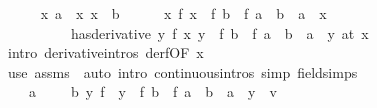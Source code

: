 \begin{isabellebody}
\ \ \ \ \isamarkupfalse%
\ x{\isacharcolon}{\kern0pt}\ {\isachardoublequoteopen}a\ {\isacharless}{\kern0pt}\ x{\isachardoublequoteclose}\ {\isachardoublequoteopen}x\ {\isacharless}{\kern0pt}\ b{\isachardoublequoteclose}\isanewline
\ \ \ \ \isamarkupfalse%
\ {\isachardoublequoteopen}{\isacharparenleft}{\kern0pt}{\isacharparenleft}{\kern0pt}{\isasymlambda}x{\isachardot}{\kern0pt}\ f\ x\ {\isacharminus}{\kern0pt}\ {\isacharparenleft}{\kern0pt}f\ b\ {\isacharminus}{\kern0pt}\ f\ a{\isacharparenright}{\kern0pt}\ {\isacharslash}{\kern0pt}\ {\isacharparenleft}{\kern0pt}b\ {\isacharminus}{\kern0pt}\ a{\isacharparenright}{\kern0pt}\ {\isacharasterisk}{\kern0pt}\ x{\isacharparenright}{\kern0pt}\ \isanewline
\ \ \ \ \ \ \ \ \ \ has{\isacharunderscore}{\kern0pt}derivative\ {\isacharparenleft}{\kern0pt}{\isasymlambda}y{\isachardot}{\kern0pt}\ f{\isacharprime}{\kern0pt}\ x\ y\ {\isacharminus}{\kern0pt}\ {\isacharparenleft}{\kern0pt}f\ b\ {\isacharminus}{\kern0pt}\ f\ a{\isacharparenright}{\kern0pt}\ {\isacharslash}{\kern0pt}\ {\isacharparenleft}{\kern0pt}b\ {\isacharminus}{\kern0pt}\ a{\isacharparenright}{\kern0pt}\ {\isacharasterisk}{\kern0pt}\ y{\isacharparenright}{\kern0pt}{\isacharparenright}{\kern0pt}\ {\isacharparenleft}{\kern0pt}at\ x{\isacharparenright}{\kern0pt}{\isachardoublequoteclose}\isanewline
\ \ \ \ \ \ \isamarkupfalse%
\ {\isacharparenleft}{\kern0pt}intro\ derivative{\isacharunderscore}{\kern0pt}intros\ derf{\isacharbrackleft}{\kern0pt}OF\ x{\isacharbrackright}{\kern0pt}{\isacharparenright}{\kern0pt}\isanewline
\ \ \isamarkupfalse%
\ {\isacharparenleft}{\kern0pt}use\ assms\ \ {\isacartoucheopen}auto\ intro{\isacharbang}{\kern0pt}{\isacharcolon}{\kern0pt}\ continuous{\isacharunderscore}{\kern0pt}intros\ simp{\isacharcolon}{\kern0pt}\ field{\isacharunderscore}{\kern0pt}simps{\isacartoucheclose}{\isacharparenright}{\kern0pt}\isanewline
\ \ \isamarkupfalse%
\ \isamarkupfalse%
\ {\isasymxi}\ \isanewline
\ \ \ \ {\isachardoublequoteopen}a\ {\isacharless}{\kern0pt}\ {\isasymxi}{\isachardoublequoteclose}\ {\isachardoublequoteopen}{\isasymxi}\ {\isacharless}{\kern0pt}\ b{\isachardoublequoteclose}\ {\isachardoublequoteopen}{\isacharparenleft}{\kern0pt}{\isasymlambda}y{\isachardot}{\kern0pt}\ f{\isacharprime}{\kern0pt}\ {\isasymxi}\ y\ {\isacharminus}{\kern0pt}\ {\isacharparenleft}{\kern0pt}f\ b\ {\isacharminus}{\kern0pt}\ f\ a{\isacharparenright}{\kern0pt}\ {\isacharslash}{\kern0pt}\ {\isacharparenleft}{\kern0pt}b\ {\isacharminus}{\kern0pt}\ a{\isacharparenright}{\kern0pt}\ {\isacharasterisk}{\kern0pt}\ y{\isacharparenright}{\kern0pt}\ {\isacharequal}{\kern0pt}\ {\isacharparenleft}{\kern0pt}{\isasymlambda}v{\isachardot}{\kern0pt}\ {}{\isacharparenright}{\kern0pt}{\isachardoublequoteclose}\ \isanewline

\end{isabellebody}
